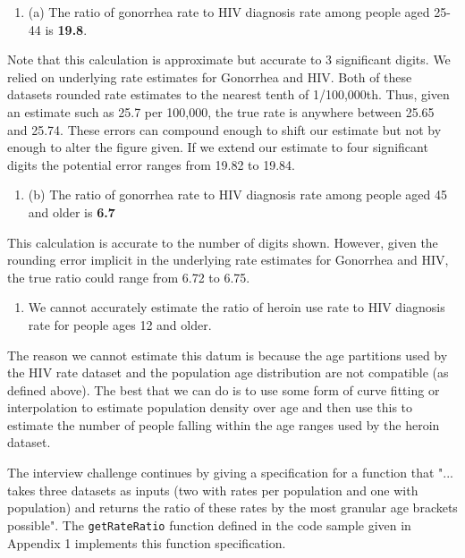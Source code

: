 \documentclass[]{article}
\begin{document}
\begin{enumerate}
\def\labelenumi{\arabic{enumi}.}
\item
  (a) The ratio of gonorrhea rate to HIV diagnosis rate among people
  aged 25-44 is \textbf{19.8}.
\end{enumerate}

Note that this calculation is approximate but accurate to 3 significant
digits. We relied on underlying rate estimates for Gonorrhea and HIV.
Both of these datasets rounded rate estimates to the nearest tenth of
1/100,000th. Thus, given an estimate such as 25.7 per 100,000, the true
rate is anywhere between 25.65 and 25.74. These errors can compound
enough to shift our estimate but not by enough to alter the figure
given. If we extend our estimate to four significant digits the
potential error ranges from 19.82 to 19.84.

\begin{enumerate}
\def\labelenumi{\arabic{enumi}.}
\item
  (b) The ratio of gonorrhea rate to HIV diagnosis rate among people
  aged 45 and older is \textbf{6.7}
\end{enumerate}

This calculation is accurate to the number of digits shown. However,
given the rounding error implicit in the underlying rate estimates for
Gonorrhea and HIV, the true ratio could range from 6.72 to 6.75.

\begin{enumerate}
\def\labelenumi{\arabic{enumi}.}
\item
  We cannot accurately estimate the ratio of heroin use rate to HIV
  diagnosis rate for people ages 12 and older.
\end{enumerate}

The reason we cannot estimate this datum is because the age partitions
used by the HIV rate dataset and the population age distribution are not
compatible (as defined above). The best that we can do is to use some
form of curve fitting or interpolation to estimate population density
over age and then use this to estimate the number of people falling
within the age ranges used by the heroin dataset.

The interview challenge continues by giving a specification for a
function that "... takes three datasets as inputs (two with rates per
population and one with population) and returns the ratio of these rates
by the most granular age brackets possible". The \texttt{getRateRatio}
function defined in the code sample given in Appendix 1 implements this
function specification.
\end{document}
